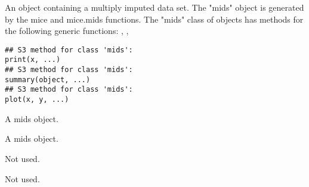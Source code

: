 \documentclass{article}
\begin{document}
\begin{Description}\relax
An object containing a multiply imputed data set. The
"mids" object is generated by the mice and mice.mids functions. The
"mids" class of objects has methods for the following generic
functions: , , 
\end{Description}
\begin{Usage}
\begin{verbatim}
## S3 method for class 'mids':
print(x, ...)
## S3 method for class 'mids':
summary(object, ...)
## S3 method for class 'mids':
plot(x, y, ...)
\end{verbatim}
\end{Usage}
\begin{Arguments}
\begin{ldescription}
\item[\code{x}] A mids object.
\item[\code{object}] A mids object.
\item[\code{y}] Not used.
\item[\code{...}] Not used.
\end{ldescription}
\end{Arguments}
\end{document}
